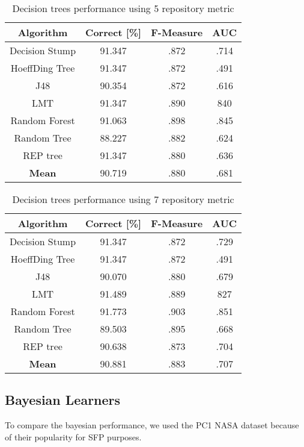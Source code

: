 \begin{table}[h!]
\centering
\begin{tabular}{ |c|c|c|c| }
 \hline
 \textbf{Algorithm} & \textbf{Correct [\%]} & \textbf{F-Measure} & \textbf{AUC}  \\
 \hline
 Decision Stump & 91.347 & .872 & .714    \\
 \hline
 HoeffDing Tree &  91.347 & .872 & .491   \\
 \hline
  J48 & 90.354 & .872 & .616\\
 \hline
  LMT & 91.347 & .890 & 840  \\
 \hline
  Random Forest & 91.063 & .898 & .845 \\
 \hline
  Random Tree & 88.227 & .882 & .624 \\
 \hline
 REP tree  & 91.347 & .880 & .636 \\
 \hline
 \textbf{Mean}  & 90.719 & .880 & .681 \\
 \hline

\end{tabular}
\caption{Decision trees performance using 5 repository metric}
\label{table:DT_5}
\end{table}

\begin{table}[h!]
\centering
\begin{tabular}{ |c|c|c|c| }
 \hline
 \textbf{Algorithm} & \textbf{Correct [\%]} & \textbf{F-Measure} & \textbf{AUC}  \\
 \hline
 Decision Stump & 91.347 & .872 & .729    \\
 \hline
 HoeffDing Tree &  91.347 & .872 & .491   \\
 \hline
  J48 & 90.070 & .880 & .679\\
 \hline
  LMT & 91.489 & .889 & 827  \\
 \hline
  Random Forest & 91.773 & .903 & .851 \\
 \hline
  Random Tree & 89.503 & .895 & .668 \\
 \hline
 REP tree  & 90.638 & .873 & .704 \\
 \hline
 \textbf{Mean}  & 90.881 & .883 & .707 \\
 \hline

\end{tabular}
\caption{Decision trees performance using 7 repository metric}
\label{table:DT_7}
\end{table}


\subsection{Bayesian Learners}
To compare the bayesian performance, we used the PC1 NASA dataset because of their popularity for SFP purposes.

